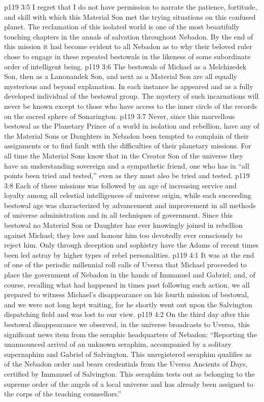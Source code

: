 \vs p119 3:5 I regret that I do not have permission to narrate the patience, fortitude, and skill with which this Material Son met the trying situations on this confused planet. The reclamation of this isolated world is one of the most beautifully touching chapters in the annals of salvation throughout Nebadon. By the end of this mission it had become evident to all Nebadon as to why their beloved ruler chose to engage in these repeated bestowals in the likeness of some subordinate order of intelligent being.
\vs p119 3:6 \pc The bestowals of Michael as a Melchizedek Son, then as a Lanonandek Son, and next as a Material Son are all equally mysterious and beyond explanation. In each instance he appeared  and as a fully developed individual of the bestowal group. The mystery of such incarnations will never be known except to those who have access to the inner circle of the records on the sacred sphere of Sonarington.
\vs p119 3:7 \pc Never, since this marvellous bestowal as the Planetary Prince of a world in isolation and rebellion, have any of the Material Sons or Daughters in Nebadon been tempted to complain of their assignments or to find fault with the difficulties of their planetary missions. For all time the Material Sons know that in the Creator Son of the universe they have an understanding sovereign and a sympathetic friend, one who has in “all points been tried and tested,” even as they must also be tried and tested.
\vs p119 3:8 Each of these missions was followed by an age of increasing service and loyalty among all celestial intelligences of universe origin, while each succeeding bestowal age was characterized by advancement and improvement in all methods of universe administration and in all techniques of government. Since this bestowal no Material Son or Daughter has ever knowingly joined in rebellion against Michael; they love and honour him too devotedly ever consciously to reject him. Only through deception and sophistry have the Adams of recent times been led astray by higher types of rebel personalities.
\vs p119 4:1 It was at the end of one of the periodic millennial roll calls of Uversa that Michael proceeded to place the government of Nebadon in the hands of Immanuel and Gabriel; and, of course, recalling what had happened in times past following such action, we all prepared to witness Michael’s disappearance on his fourth mission of bestowal, and we were not long kept waiting, for he shortly went out upon the Salvington dispatching field and was lost to our view.
\vs p119 4:2 On the third day after this bestowal disappearance we observed, in the universe broadcasts to Uversa, this significant news item from the seraphic headquarters of Nebadon: “Reporting the unannounced arrival of an unknown seraphim, accompanied by a solitary supernaphim and Gabriel of Salvington. This unregistered seraphim qualifies as of the Nebadon order and bears credentials from the Uversa Ancients of Days, certified by Immanuel of Salvington. This seraphim tests out as belonging to the supreme order of the angels of a local universe and has already been assigned to the corps of the teaching counsellors.”
